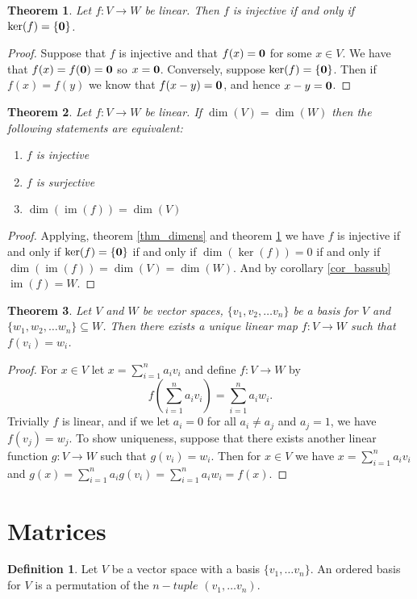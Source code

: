 \documentclass[oneside, 12pt]{book}
\DeclareMathOperator{\im}{im}
\newtheorem{thm}{Theorem}[section]
\theoremstyle{definition}
\newtheorem{defn}{Definition}[section]
\begin{document}
\begin{thm}
  \label{thm_inj}
Let $f: V \to W$ be linear. Then $f$ is injective if and only if $\ker(f)=\{\bold{0}\}$.
\end{thm}
\begin{proof}
Suppose that $f$ is injective and that $f(x)=\bold{0}$ for some $x \in V$. We have that $f(x)=f(\bold{0})=\bold{0}$ so $x=\bold{0}$. Conversely, suppose $\ker(f)=\{\bold{0}\}$. Then if $f(x)=f(y)$ we know that $f(x-y)=\bold{0}$, and hence $x-y=\bold{0}$.
\end{proof}
\begin{thm}
  \label{thm_injsur}
  Let $f: V \to W$ be linear. If $\dim(V)=\dim(W)$ then the following statements are equivalent:
  \begin{enumerate}
    \item $f$ is injective
    \item $f$ is surjective
    \item $\dim(\im(f))=\dim(V)$
  \end{enumerate}
\end{thm}
\begin{proof}
  Applying, theorem \ref{thm_dimens} and theorem \ref{thm_inj} we have $f$ is injective if and only if $\ker(f)=\{\bold{0}\}$ if and only if $\dim(\ker(f))=0$ if and only if $\dim(\im(f))=\dim(V)=\dim(W)$. And by corollary \ref{cor_bassub} $\im(f)=W$.
\end{proof}
\begin{thm}
\label{thm_uniqmap}
Let $V$ and $W$ be vector spaces,  $\{v_{1},v_{2}, \dots v_{n}\}$ be a basis for $V$ and $\{w_{1},w_{2}, \dots w_{n}\} \subseteq W$. Then there exists a unique linear map $f: V \to W$ such that $f(v_{i})=w_{i}$.
\end{thm}
\begin{proof}
For $x \in V$ let $x=\sum\limits_{i=1}^{n}a_{i}v_{i}$ and define $f:V \to W$ by \[f(\sum\limits_{i=1}^{n}a_{i}v_{i})=\sum\limits_{i=1}^{n}a_{i}w_{i}.\] Trivially $f$ is linear, and if we let $a_{i}=0$ for all $a_{i}\neq a_{j}$ and $a_{j}=1$, we have $f(v_{j})=w_{j}$. To show uniqueness, suppose that there exists another linear function $g:V \to W$ such that $g(v_{i})=w_{i}$. Then for $x \in V$ we have $x=\sum\limits_{i=1}^{n}a_{i}v_{i}$ and $g(x)=\sum\limits_{i=1}^{n}a_{i}g(v_{i})=\sum\limits_{i=1}^{n}a_{i}w_{i}=f(x)$.
\end{proof}
\section{Matrices}
\begin{defn}
  \label{defn_orbase}
Let $V$ be a vector space with a basis $\{v_{1},\dots v_{n}\}$. An ordered basis for $V$ is a permutation of the $n-tuple$ $(v_{1}, \dots v_{n})$.
\end{defn}
\end{document}
